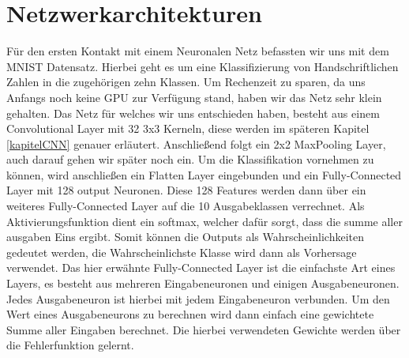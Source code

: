 \section{Netzwerkarchitekturen}
Für den ersten Kontakt mit einem Neuronalen Netz befassten wir uns mit dem MNIST Datensatz. Hierbei geht es um eine Klassifizierung von Handschriftlichen Zahlen in die zugehörigen zehn Klassen. Um Rechenzeit zu sparen, da uns Anfangs noch keine GPU zur Verfügung stand, haben wir das Netz sehr klein gehalten. Das Netz für welches wir uns entschieden haben, besteht aus einem Convolutional Layer mit 32 3x3 Kerneln, diese werden im späteren Kapitel \ref{kapitelCNN} genauer erläutert. Anschließend folgt ein 2x2 MaxPooling Layer, auch darauf gehen wir später noch ein. Um die Klassifikation vornehmen zu können, wird anschließen ein Flatten Layer eingebunden und ein Fully-Connected Layer mit 128 output Neuronen. Diese 128 Features werden dann über ein weiteres Fully-Connected Layer auf die 10 Ausgabeklassen verrechnet. Als Aktivierungsfunktion dient ein softmax, welcher dafür sorgt, dass die summe aller ausgaben Eins ergibt. Somit können die Outputs als Wahrscheinlichkeiten gedeutet werden, die Wahrscheinlichste Klasse wird dann als Vorhersage verwendet.
Das hier erwähnte Fully-Connected Layer ist die einfachste Art eines Layers, es besteht aus mehreren Eingabeneuronen und einigen Ausgabeneuronen. Jedes Ausgabeneuron ist hierbei mit jedem Eingabeneuron verbunden. Um den Wert eines Ausgabeneurons zu berechnen wird dann einfach eine gewichtete Summe aller Eingaben berechnet. Die hierbei verwendeten Gewichte werden über die Fehlerfunktion gelernt.

